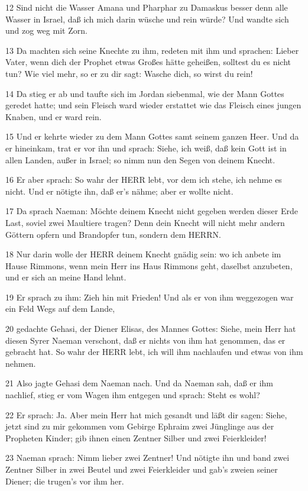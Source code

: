 \par 12 Sind nicht die Wasser Amana und Pharphar zu Damaskus besser denn alle Wasser in Israel, daß ich mich darin wüsche und rein würde? Und wandte sich und zog weg mit Zorn.
\par 13 Da machten sich seine Knechte zu ihm, redeten mit ihm und sprachen: Lieber Vater, wenn dich der Prophet etwas Großes hätte geheißen, solltest du es nicht tun? Wie viel mehr, so er zu dir sagt: Wasche dich, so wirst du rein!
\par 14 Da stieg er ab und taufte sich im Jordan siebenmal, wie der Mann Gottes geredet hatte; und sein Fleisch ward wieder erstattet wie das Fleisch eines jungen Knaben, und er ward rein.
\par 15 Und er kehrte wieder zu dem Mann Gottes samt seinem ganzen Heer. Und da er hineinkam, trat er vor ihn und sprach: Siehe, ich weiß, daß kein Gott ist in allen Landen, außer in Israel; so nimm nun den Segen von deinem Knecht.
\par 16 Er aber sprach: So wahr der HERR lebt, vor dem ich stehe, ich nehme es nicht. Und er nötigte ihn, daß er's nähme; aber er wollte nicht.
\par 17 Da sprach Naeman: Möchte deinem Knecht nicht gegeben werden dieser Erde Last, soviel zwei Maultiere tragen? Denn dein Knecht will nicht mehr andern Göttern opfern und Brandopfer tun, sondern dem HERRN.
\par 18 Nur darin wolle der HERR deinem Knecht gnädig sein: wo ich anbete im Hause Rimmons, wenn mein Herr ins Haus Rimmons geht, daselbst anzubeten, und er sich an meine Hand lehnt.
\par 19 Er sprach zu ihm: Zieh hin mit Frieden! Und als er von ihm weggezogen war ein Feld Wegs auf dem Lande,
\par 20 gedachte Gehasi, der Diener Elisas, des Mannes Gottes: Siehe, mein Herr hat diesen Syrer Naeman verschont, daß er nichts von ihm hat genommen, das er gebracht hat. So wahr der HERR lebt, ich will ihm nachlaufen und etwas von ihm nehmen.
\par 21 Also jagte Gehasi dem Naeman nach. Und da Naeman sah, daß er ihm nachlief, stieg er vom Wagen ihm entgegen und sprach: Steht es wohl?
\par 22 Er sprach: Ja. Aber mein Herr hat mich gesandt und läßt dir sagen: Siehe, jetzt sind zu mir gekommen vom Gebirge Ephraim zwei Jünglinge aus der Propheten Kinder; gib ihnen einen Zentner Silber und zwei Feierkleider!
\par 23 Naeman sprach: Nimm lieber zwei Zentner! Und nötigte ihn und band zwei Zentner Silber in zwei Beutel und zwei Feierkleider und gab's zweien seiner Diener; die trugen's vor ihm her.
